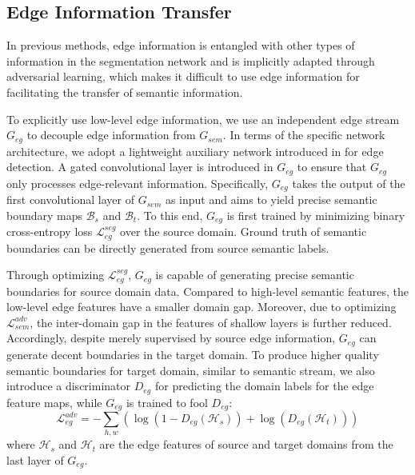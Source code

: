 \documentclass[sigconf]{acmart}
\begin{document}
\subsection{Edge Information Transfer}
\par In previous methods, edge information is entangled with other types of information in the segmentation network and is implicitly adapted through adversarial learning, which makes it difficult to use edge information for facilitating the transfer of semantic information.

\par To explicitly use low-level edge information, we use an independent edge stream $G_{eg}$ to decouple edge information from $G_{sem}$. In terms of the specific network architecture, we adopt a lightweight auxiliary network introduced in \cite{takikawa2019gated} for edge detection. A gated convolutional layer is introduced in $G_{eg}$ to ensure that $G_{eg}$ only processes edge-relevant information. Specifically, $G_{eg}$ takes the output of the first convolutional layer of $G_{sem}$ as input and aims to yield precise semantic boundary maps $\mathcal{B}_{s}$ and $\mathcal{B}_{t}$. To this end, $G_{eg}$ is first trained by minimizing binary cross-entropy loss $\mathcal{L}_{eg}^{seg}$ over the source domain. Ground truth of semantic boundaries can be directly generated from source semantic labels.  

\par Through optimizing $\mathcal{L}_{eg}^{seg}$, $G_{eg}$ is capable of generating precise semantic boundaries for source domain data. Compared to high-level semantic features, the low-level edge features have a smaller domain gap. Moreover, due to optimizing $\mathcal{L}_{s e m}^{a d v}$, the inter-domain gap in the features of shallow layers is further reduced. Accordingly, despite merely supervised by source edge information, $G_{eg}$ can generate decent boundaries in the target domain. To produce higher quality semantic boundaries for target domain, similar to semantic stream, we also introduce a discriminator $D_{eg}$ for predicting the domain labels for the edge feature maps, while $G_{eg}$ is trained to fool $D_{eg}$:
\begin{equation}
    \mathcal{L}_{e g}^{a d v}=-\sum_{h, w}\left(\log \left(1-D_{eg}\left(\mathcal{H}_{s}\right)\right)+\log \left(D_{eg}\left(\mathcal{H}_{t}\right)\right)\right)
\label{eq:3}
\end{equation}
where $\mathcal{H}_{s}$ and $\mathcal{H}_{t}$ are the edge features of source and target domains from the last layer of $G_{eg}$. 
\end{document}
